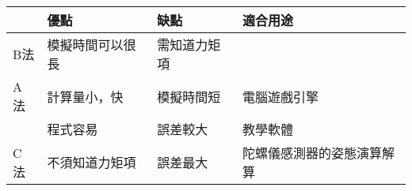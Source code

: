 \documentclass{article}
\begin{document}
\begin{center}
\begin{tabular}{| l | l | l | l |}
   \hline
   & 優點 & 缺點 & 適合用途 \\%
   \hline
   B法  & 模擬時間可以很長  & 需知道力矩項 &  \\
   \hline
   A法 & 計算量小，快 & 模擬時間短 & 電腦遊戲引擎 \\
          & 程式容易          & 誤差較大    & 教學軟體 \\
   \hline
   C法 & 不須知道力矩項  & 誤差最大 & 陀螺儀感測器的姿態演算解算\\
   \hline
   
\end{tabular}
\end{center}
\end{document}
